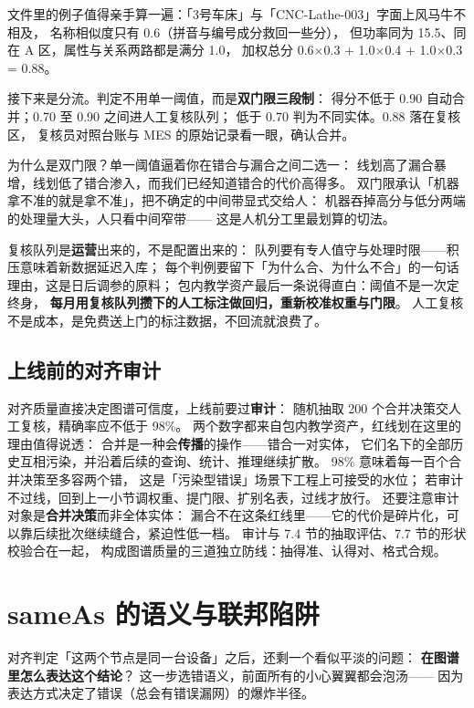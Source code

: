 文件里的例子值得亲手算一遍：「3号车床」与「CNC-Lathe-003」字面上风马牛不相及，
名称相似度只有 0.6（拼音与编号成分救回一些分），
但功率同为 15.5、同在 A 区，属性与关系两路都是满分 1.0，
加权总分 0.6\(\times\)0.3 + 1.0\(\times\)0.4 + 1.0\(\times\)0.3 = 0.88。

接下来是分流。判定不用单一阈值，而是\textbf{双门限三段制}：
得分不低于 0.90 自动合并；0.70 至 0.90 之间进人工复核队列；
低于 0.70 判为不同实体。0.88 落在复核区，
复核员对照台账与 MES 的原始记录看一眼，确认合并。

为什么是双门限？单一阈值逼着你在错合与漏合之间二选一：
线划高了漏合暴增，线划低了错合渗入，而我们已经知道错合的代价高得多。
双门限承认「机器拿不准的就是拿不准」，把不确定的中间带显式交给人：
机器吞掉高分与低分两端的处理量大头，人只看中间窄带——
这是人机分工里最划算的切法。

复核队列是\textbf{运营}出来的，不是配置出来的：
队列要有专人值守与处理时限——积压意味着新数据延迟入库；
每个判例要留下「为什么合、为什么不合」的一句话理由，这是日后调参的原料；
包内教学资产最后一条说得直白：阈值不是一次定终身，
\textbf{每月用复核队列攒下的人工标注做回归，重新校准权重与门限}。
人工复核不是成本，是免费送上门的标注数据，不回流就浪费了。

\subsection{上线前的对齐审计}

对齐质量直接决定图谱可信度，上线前要过\textbf{审计}：
随机抽取 200 个合并决策交人工复核，精确率应不低于 98\%。
两个数字都来自包内教学资产，红线划在这里的理由值得说透：
合并是一种会\textbf{传播}的操作——错合一对实体，
它们名下的全部历史互相污染，并沿着后续的查询、统计、推理继续扩散。
98\% 意味着每一百个合并决策至多容两个错，
这是「污染型错误」场景下工程上可接受的水位；
若审计不过线，回到上一小节调权重、提门限、扩别名表，过线才放行。
还要注意审计对象是\textbf{合并决策}而非全体实体：
漏合不在这条红线里——它的代价是碎片化，可以靠后续批次继续缝合，紧迫性低一档。
审计与 7.4 节的抽取评估、7.7 节的形状校验合在一起，
构成图谱质量的三道独立防线：抽得准、认得对、格式合规。

\section{sameAs 的语义与联邦陷阱}

对齐判定「这两个节点是同一台设备」之后，还剩一个看似平淡的问题：
\textbf{在图谱里怎么表达这个结论}？
这一步选错语义，前面所有的小心翼翼都会泡汤——
因为表达方式决定了错误（总会有错误漏网）的爆炸半径。

